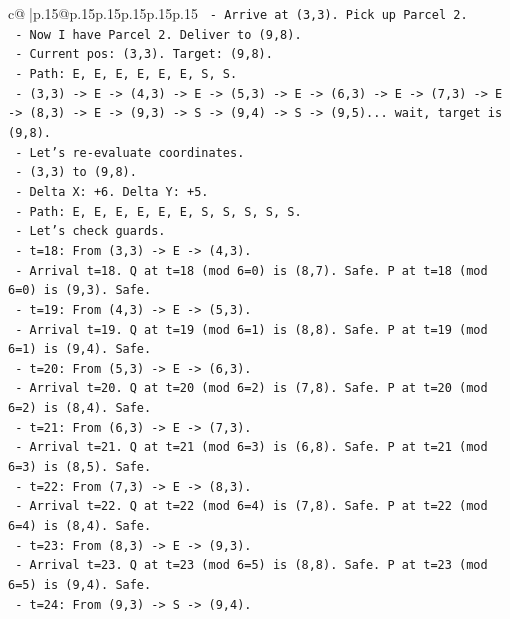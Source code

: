 \documentclass{article}
\begin{document}
{\begin{supertabular}{c@{$\;$}|p{.15\linewidth}@{}p{.15\linewidth}p{.15\linewidth}p{.15\linewidth}p{.15\linewidth}p{.15\linewidth}}
{{{\texttt{       {-} Arrive at (3,3). Pick up Parcel 2.} \\
\texttt{     {-} Now I have Parcel 2. Deliver to (9,8).} \\
\texttt{     {-} Current pos: (3,3). Target: (9,8).} \\
\texttt{     {-} Path: E, E, E, E, E, E, S, S.} \\
\texttt{     {-} (3,3) {-}> E {-}> (4,3) {-}> E {-}> (5,3) {-}> E {-}> (6,3) {-}> E {-}> (7,3) {-}> E {-}> (8,3) {-}> E {-}> (9,3) {-}> S {-}> (9,4) {-}> S {-}> (9,5)... wait, target is (9,8).} \\
\texttt{     {-} Let's re{-}evaluate coordinates.} \\
\texttt{     {-} (3,3) to (9,8).} \\
\texttt{     {-} Delta X: +6. Delta Y: +5.} \\
\texttt{     {-} Path: E, E, E, E, E, E, S, S, S, S, S.} \\
\texttt{     {-} Let's check guards.} \\
\texttt{     {-} t=18: From (3,3) {-}> E {-}> (4,3).} \\
\texttt{       {-} Arrival t=18. Q at t=18 (mod 6=0) is (8,7). Safe. P at t=18 (mod 6=0) is (9,3). Safe.} \\
\texttt{     {-} t=19: From (4,3) {-}> E {-}> (5,3).} \\
\texttt{       {-} Arrival t=19. Q at t=19 (mod 6=1) is (8,8). Safe. P at t=19 (mod 6=1) is (9,4). Safe.} \\
\texttt{     {-} t=20: From (5,3) {-}> E {-}> (6,3).} \\
\texttt{       {-} Arrival t=20. Q at t=20 (mod 6=2) is (7,8). Safe. P at t=20 (mod 6=2) is (8,4). Safe.} \\
\texttt{     {-} t=21: From (6,3) {-}> E {-}> (7,3).} \\
\texttt{       {-} Arrival t=21. Q at t=21 (mod 6=3) is (6,8). Safe. P at t=21 (mod 6=3) is (8,5). Safe.} \\
\texttt{     {-} t=22: From (7,3) {-}> E {-}> (8,3).} \\
\texttt{       {-} Arrival t=22. Q at t=22 (mod 6=4) is (7,8). Safe. P at t=22 (mod 6=4) is (8,4). Safe.} \\
\texttt{     {-} t=23: From (8,3) {-}> E {-}> (9,3).} \\
\texttt{       {-} Arrival t=23. Q at t=23 (mod 6=5) is (8,8). Safe. P at t=23 (mod 6=5) is (9,4). Safe.} \\
\texttt{     {-} t=24: From (9,3) {-}> S {-}> (9,4).} \\
}}}
\end{supertabular}}
\end{document}
